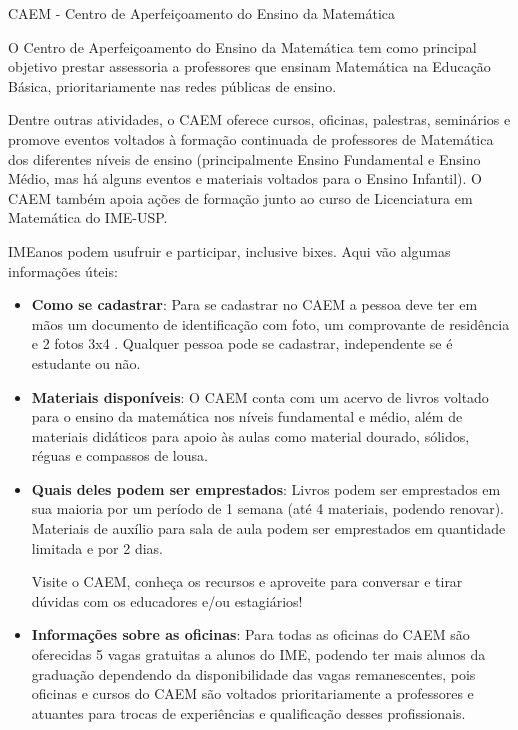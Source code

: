 \begin{secao}{CAEM - Centro de Aperfeiçoamento do Ensino da Matemática}

O Centro de Aperfeiçoamento do Ensino da Matemática tem como principal
objetivo prestar assessoria a professores que ensinam
Matemática na Educação Básica, prioritariamente nas redes públicas de
ensino.

Dentre outras atividades, o CAEM oferece cursos, oficinas, palestras,
seminários e promove eventos voltados à formação continuada de
professores de Matemática dos diferentes níveis de ensino
(principalmente Ensino Fundamental e Ensino Médio, mas há alguns eventos
e materiais voltados para o Ensino Infantil). O CAEM também apoia ações
de formação junto ao curso de Licenciatura em Matemática do IME-USP.

IMEanos podem usufruir e participar, inclusive bixes. Aqui vão algumas
informações úteis:

\begin{itemize}

\item \textbf{Como se cadastrar}: Para se cadastrar no CAEM a pessoa
deve ter em mãos um documento de identificação com foto, um comprovante
de residência e 2 fotos 3x4 . Qualquer pessoa pode se cadastrar,
independente se é estudante ou não.

\item \textbf{Materiais disponíveis}: O CAEM conta com um acervo de
livros voltado para o ensino da matemática nos níveis fundamental e
médio, além de materiais didáticos para apoio às aulas como material
dourado, sólidos, réguas e compassos de lousa.

\item \textbf{Quais deles podem ser emprestados}: Livros podem ser
emprestados em sua maioria por um período de 1 semana (até 4 materiais,
podendo renovar). Materiais de auxílio para sala de aula podem ser
emprestados em quantidade limitada e por 2 dias.

  Visite o CAEM, conheça os recursos e aproveite para conversar e
  tirar dúvidas com os educadores e/ou estagiários!    

\item \textbf{Informações sobre as oficinas}: Para todas as oficinas do 
CAEM são oferecidas 5 vagas gratuitas a alunos do IME, podendo 
ter mais alunos da graduação dependendo da disponibilidade das vagas 
remanescentes, pois oficinas e cursos do CAEM são voltados prioritariamente 
a professores e atuantes para trocas de experiências e 
qualificação desses profissionais.



\end{itemize}
\end{secao}
